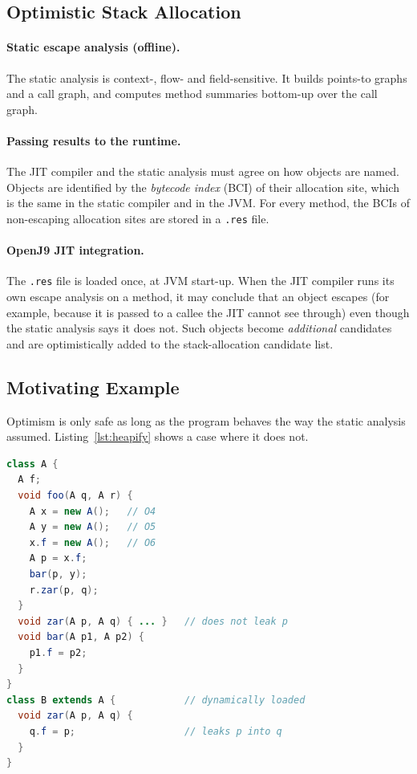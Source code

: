 \subsection{Optimistic Stack Allocation}

\paragraph{Static escape analysis (offline).} The static analysis is context-, flow- and
field-sensitive. It builds points-to graphs and a call graph, and computes method summaries
bottom-up over the call graph.

\paragraph{Passing results to the runtime.} The JIT compiler and the static analysis must agree
on how objects are named. Objects are identified by the \emph{bytecode index} (BCI) of their
allocation site, which is the same in the static compiler and in the JVM. For every method, the
BCIs of non-escaping allocation sites are stored in a \texttt{.res} file.

\paragraph{OpenJ9 JIT integration.} The \texttt{.res} file is loaded once, at JVM start-up. When
the JIT compiler runs its own escape analysis on a method, it may conclude that an object escapes
(for example, because it is passed to a callee the JIT cannot see through) even though the static
analysis says it does not. Such objects become \emph{additional} candidates and are
optimistically added to the stack-allocation candidate list.

\subsection{Motivating Example}

Optimism is only safe as long as the program behaves the way the static analysis assumed.
Listing~\ref{lst:heapify} shows a case where it does not.

\begin{lstlisting}[language=Java, caption={Dynamic class loading invalidates a static escape result.}, label={lst:heapify}]
class A {
  A f;
  void foo(A q, A r) {
    A x = new A();   // O4
    A y = new A();   // O5
    x.f = new A();   // O6
    A p = x.f;
    bar(p, y);
    r.zar(p, q);
  }
  void zar(A p, A q) { ... }   // does not leak p
  void bar(A p1, A p2) {
    p1.f = p2;
  }
}
class B extends A {            // dynamically loaded
  void zar(A p, A q) {
    q.f = p;                   // leaks p into q
  }
}
\end{lstlisting}

